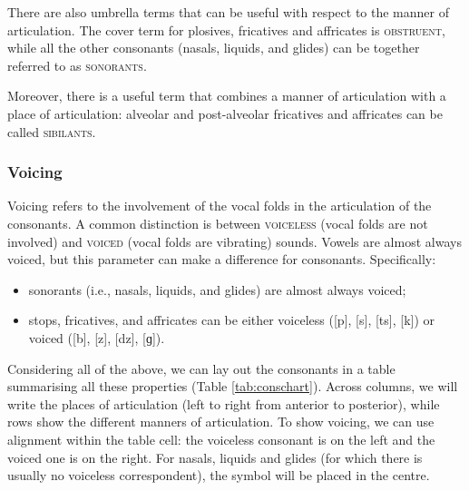\begin{refsection}
There are also umbrella terms that can be useful with respect to the manner of articulation. The cover term for plosives, fricatives and affricates is \textsc{obstruent}, while all the other consonants (nasals, liquids, and glides) can be together referred to as \textsc{sonorants}.

Moreover, there is a useful term that combines a manner of articulation with a place of articulation: alveolar and post-alveolar fricatives and affricates can be called \textsc{sibilants}.

\subsubsection{Voicing}

Voicing refers to the involvement of the vocal folds in the articulation of the consonants. A common distinction is between \textsc{voiceless} (vocal folds are not involved) and \textsc{voiced} (vocal folds are vibrating) sounds. Vowels are almost always voiced, but this parameter can make a difference for consonants. Specifically:

\begin{itemize}
    \item sonorants (i.e., nasals, liquids, and glides) are almost always voiced;
    \item stops, fricatives, and affricates can be either voiceless ([{p}], [{s}], [{ts}], [{k}]) or voiced ([{b}], [{z}], [{dz}], [{ɡ}]).
    \end{itemize}

Considering all of the above, we can lay out the consonants in a table summarising all these properties (Table \ref{tab:conschart}). Across columns, we will write the places of articulation (left to right from anterior to posterior), while rows show the different manners of articulation. To show voicing, we can use alignment within the table cell: the voiceless consonant is on the left and the voiced one is on the right. For nasals, liquids and glides (for which there is usually no voiceless correspondent), the symbol will be placed in the centre.


\end{refsection}
